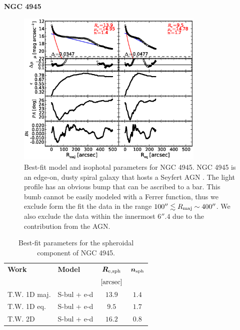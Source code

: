 \documentclass[preprint2]{emulateapj}
\newcommand{\fitfigurewidth}{0.8\textwidth}
\begin{document}
  \clearpage\newpage\noindent
  {\bf NGC 4945 \\}

  \begin{figure}[h]
  \begin{center}
  \includegraphics[width=\fitfigurewidth]{images/n4945_1Dfit.eps}
  \caption{Best-fit model and isophotal parameters for NGC 4945.
  NGC 4945 is an edge-on, dusty spiral galaxy that hosts a Seyfert AGN \citep{lin2011}.
  The light profile has an obvious bump that can be ascribed to a bar.
  This bumb cannot be easily modeled with a Ferrer function, thus we exclude form the fit the data in the range $100'' \lesssim R_{\rm maj} \sim 400''$.
  We also exclude the data within the innermost $6''.4$ due to the contribution from the AGN.
  }
  \end{center}
  \end{figure}

  \begin{table}[h]
  \small
  \caption{Best-fit parameters for the spheroidal component of NGC 4945.}
  \begin{center}
  \begin{tabular}{llcc}
  \hline
  {\bf Work} & {\bf Model}   & $\bm R_{\rm e,sph}$    & $\bm n_{\rm sph}$ \\
    &  &  $[\rm arcsec]$ & \\
  \hline
  T.W. 1D maj. & S-bul + e-d & $13.9$  &  $1.4$ \\
  T.W. 1D eq.  & S-bul + e-d & $9.5$   &  $1.7$ \\
  T.W. 2D      & S-bul + e-d & $16.2$  &  $0.8$ \\
  \hline
  \end{tabular}
  \end{center}
  \label{tab:n4945}
  \end{table}
\end{document}
